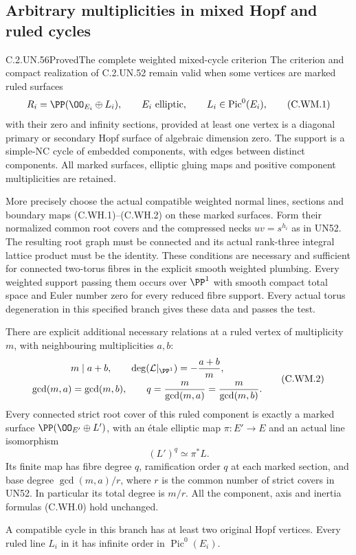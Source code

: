 \subsection{Arbitrary multiplicities in mixed Hopf and ruled cycles}

\begin{statement}{C.2.UN.56}{Proved}{The complete weighted mixed-cycle criterion}
The criterion and compact realization of C.2.UN.52
remain valid when some vertices are marked ruled surfaces
\[
        R_i=\PP(\OO_{E_i}\oplus L_i),\qquad
        E_i\ \hbox{elliptic},\qquad L_i\in\operatorname{Pic}^0(E_i),
\tag{C.WM.1}
\]
with their zero and infinity sections, provided at least
one vertex is a diagonal primary or secondary Hopf surface
of algebraic dimension zero. The support is a simple-NC
cycle of embedded components, with edges between distinct
components. All marked surfaces, elliptic gluing maps and
positive component multiplicities are retained.

More precisely choose the actual compatible weighted normal
lines, sections and boundary maps (C.WH.1)--(C.WH.2) on
these marked surfaces. Form their normalized common root
covers and the compressed necks $uv=s^{h_i}$ as in UN52.
The resulting root graph must be connected and its actual
rank-three integral lattice product must be the identity.
These conditions are necessary and sufficient for connected
two-torus fibres in the explicit smooth weighted plumbing.
Every weighted support passing them occurs over $\PP^1$
with smooth compact total space and Euler number zero for
every reduced fibre support. Every actual torus degeneration
in this specified branch gives these data and passes the test.

There are explicit additional necessary relations at a ruled
vertex of multiplicity $m$, with neighbouring multiplicities
$a,b$:
\[
 \begin{gathered}
      m\mid a+b,\qquad
      \deg(\mathcal L|_{\PP^1})=-\frac{a+b}{m},\\
      \gcd(m,a)=\gcd(m,b),\qquad
      q=\frac{m}{\gcd(m,a)}
         =\frac{m}{\gcd(m,b)}.
 \end{gathered}
\tag{C.WM.2}
\]
Every connected strict root cover of this ruled component
is exactly a marked surface
$\PP(\OO_{E'}\oplus L')$, with an \'{e}tale elliptic map
$\pi:E'\to E$ and an actual line isomorphism
\[
                   (L')^q\simeq\pi^*L.
\tag{C.WM.3}
\]
Its finite map has fibre degree $q$, ramification order
$q$ at each marked section, and base degree
$\gcd(m,a)/r$, where $r$ is the common number of strict
covers in UN52. In particular its total degree is $m/r$.
All the component, axis and inertia formulas (C.WH.0)
hold unchanged.

A compatible cycle in this branch has at least two
original Hopf vertices. Every ruled line $L_i$ in it
has infinite order in $\operatorname{Pic}^0(E_i)$.
\end{statement}

